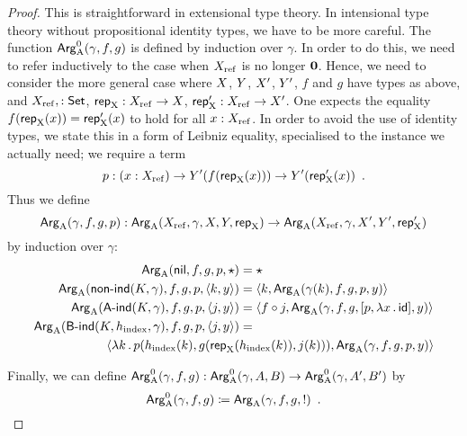 \documentclass{article}
\begin{document}
\begin{proof}
  This is straightforward in extensional type theory. In intensional
  type theory without propositional identity types, we have to be more
  careful. The function $\ArgAp(\gamma, f, g)$ is defined by induction
  over $\gamma$. In order to do this, we need to refer inductively to
  the case when $\Xref$ is no longer $\zero$. Hence, we need to
  consider the more general case where $\A$, $\B$, $\A'$, $\B'$, $f$
  and $g$ have types as above, and $\Xref, : \Set$, $\repA : \Xref \to
  \A$, $\repA' : \Xref \to \A'$. One expects the equality $f(\repA(x))
  = \repA'(x)$ to hold for all $x : \Xref$. In order to avoid the use
  of identity types, we state this in a form of Leibniz equality,
  specialised to the instance we actually need;  we require a term
  \[
  p : (x : \Xref) \to \B'(f(\repA(x))) \to \B'(\repA'(x)) \enspace .
  \]
  Thus we define
  \[
  \ArgA(\gamma, f, g, p) : %
  \ArgA(\Xref, \gamma, \A, \B, \repA)
  \to \ArgA(\Xref, \gamma, \A', \B', \repA')
  \]
  by induction over $\gamma$:
  \begin{align*}
    \ArgA(\nilA, f, g, p, \oneelt) &= \oneelt\\
    \ArgA(\nonindA(K, \gamma), f, g, p, \pair{k}{y}) &= \pair{k}{\ArgA(\gamma(k), f, g, p, y)}\\
    \ArgA(\AindA(K, \gamma), f, g, p, \pair{j}{y}) &= \pair{f \circ j}{\ArgA(\gamma, f, g, [p, \lambda x\,.\,\id], y)}\\
    \ArgA(\BindA(K, \hindex, \gamma), f, g, p, \pair{j}{y}) &= \\
    \pair{\lambda k\,.\,p(\hindex(k), g(\repA(&\hindex(k)), j(k)))}{\ArgA(\gamma, f, g, p, y)}
  \end{align*}
  
  Finally, we can define $\ArgAp(\gamma, f, g) : \ArgAp(\gamma, A, B) \to
  \ArgAp(\gamma, A', B')$ by
  \[
  \ArgAp(\gamma, f, g) \coloneqq \ArgA(\gamma,f, g, \magicOmit{B'(f(\repA(x))) \to B'(\repA'(x))}) \enspace .
  \]
\end{proof}
\end{document}
